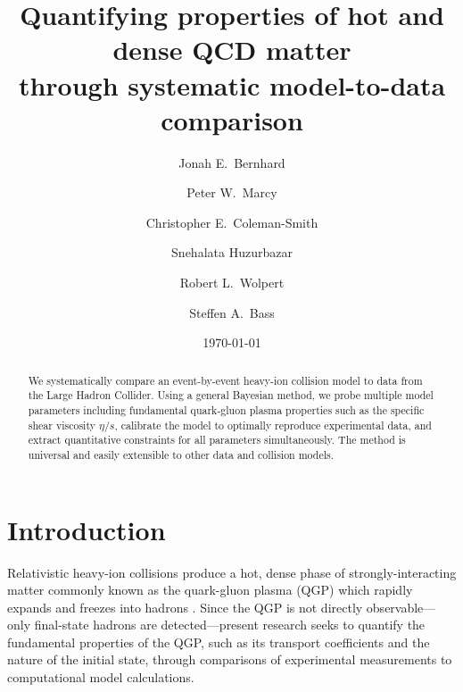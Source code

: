 \documentclass[aps,prc,reprint,superscriptaddress,amsmath]{revtex4-1}
\begin{document}
\title{Quantifying properties of hot and dense QCD matter \\ through systematic model-to-data comparison}

\author{Jonah E.\ Bernhard}

\author{Peter W.\ Marcy}

\author{Christopher E.\ Coleman-Smith}

\author{Snehalata Huzurbazar}

\author{Robert L.\ Wolpert}

\author{Steffen A.\ Bass}

\date{\today}

\begin{abstract}
  We systematically compare an event-by-event heavy-ion collision model to data from the Large Hadron Collider.
  Using a general Bayesian method, we probe multiple model parameters including fundamental quark-gluon plasma properties such as the specific shear viscosity $\eta/s$, calibrate the model to optimally reproduce experimental data, and extract quantitative constraints for all parameters simultaneously.
  The method is universal and easily extensible to other data and collision models.
\end{abstract}

\maketitle


\section{Introduction}

Relativistic heavy-ion collisions produce a hot, dense phase of strongly-interacting matter commonly known as the quark-gluon plasma (QGP) which rapidly expands and freezes into hadrons \cite{Arsene:2004fa,Adcox:2004mh,Back:2004je,Adams:2005dq,Gyulassy:2004zy,Muller:2006ee,Muller:2012zq}.
Since the QGP is not directly observable---only final-state hadrons are detected---present research seeks to quantify the fundamental properties of the QGP, such as its transport coefficients and the nature of the initial state, through comparisons of experimental measurements to computational model calculations.
\end{document}
